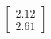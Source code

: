 \documentclass[preview]{standalone}
\begin{document}
\begin{align*}
\begin{bmatrix} 2.12 \\ 2.61 \end{bmatrix}
\end{align*}
\end{document}

